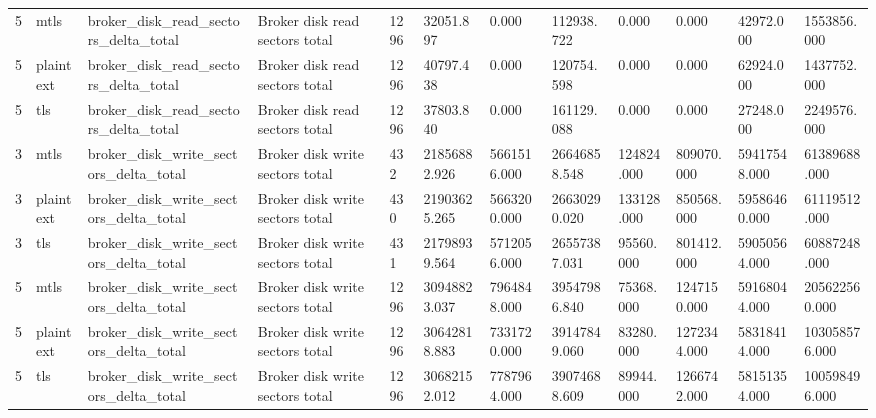 \begin{longtable}{llllllllllll}
5 & mtls & broker\_disk\_read\_sectors\_delta\_total & Broker disk read sectors total & 1296 & 32051.897 & 0.000 & 112938.722 & 0.000 & 0.000 & 42972.000 & 1553856.000 \\
5 & plaintext & broker\_disk\_read\_sectors\_delta\_total & Broker disk read sectors total & 1296 & 40797.438 & 0.000 & 120754.598 & 0.000 & 0.000 & 62924.000 & 1437752.000 \\
5 & tls & broker\_disk\_read\_sectors\_delta\_total & Broker disk read sectors total & 1296 & 37803.840 & 0.000 & 161129.088 & 0.000 & 0.000 & 27248.000 & 2249576.000 \\
3 & mtls & broker\_disk\_write\_sectors\_delta\_total & Broker disk write sectors total & 432 & 21856882.926 & 5661516.000 & 26646858.548 & 124824.000 & 809070.000 & 59417548.000 & 61389688.000 \\
3 & plaintext & broker\_disk\_write\_sectors\_delta\_total & Broker disk write sectors total & 430 & 21903625.265 & 5663200.000 & 26630290.020 & 133128.000 & 850568.000 & 59586460.000 & 61119512.000 \\
3 & tls & broker\_disk\_write\_sectors\_delta\_total & Broker disk write sectors total & 431 & 21798939.564 & 5712056.000 & 26557387.031 & 95560.000 & 801412.000 & 59050564.000 & 60887248.000 \\
5 & mtls & broker\_disk\_write\_sectors\_delta\_total & Broker disk write sectors total & 1296 & 30948823.037 & 7964848.000 & 39547986.840 & 75368.000 & 1247150.000 & 59168044.000 & 205622560.000 \\
5 & plaintext & broker\_disk\_write\_sectors\_delta\_total & Broker disk write sectors total & 1296 & 30642818.883 & 7331720.000 & 39147849.060 & 83280.000 & 1272344.000 & 58318414.000 & 103058576.000 \\
5 & tls & broker\_disk\_write\_sectors\_delta\_total & Broker disk write sectors total & 1296 & 30682152.012 & 7787964.000 & 39074688.609 & 89944.000 & 1266742.000 & 58151354.000 & 100598496.000 \\
\hline
\end{longtable}
